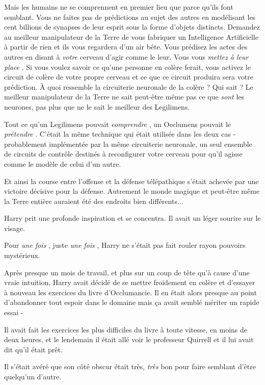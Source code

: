Mais les humains ne se comprennent en premier lieu que parce qu'ils font semblant. Vous ne faites pas de prédictions au sujet des autres en modélisant les cent billions de synapses de leur esprit sous la forme d'objets distincts. Demandez au meilleur manipulateur de la Terre de vous fabriquer un Intelligence Artificielle à partir de rien et ils vous regardera d'un air bête. Vous prédisez les actes des autres en disant à \emph{votre}  cerveau d'agir comme le leur. Vous vous \emph{mettez à leur place} . Si vous voulez savoir ce qu'une personne en colère ferait, vous activez le circuit de colère de votre propre cerveau et ce que ce circuit produira sera votre prédiction. À quoi ressemble la circuiterie neuronale de la colère ? Qui sait ? Le meilleur manipulateur de la Terre ne sait peut-être même pas ce que \emph{sont } les neurones, pas plus que ne le sait le meilleur des Legilimens.

Tout ce qu'un Legilimens pouvait \emph{comprendre} , un Occlumens pouvait le \emph{prétendre} . C'était la même technique qui était utilisée dans les deux cas - probablement implémentée par la même circuiterie neuronale, un seul ensemble de circuits de contrôle destinés à reconfigurer votre cerveau pour qu'il agisse comme le modèle de celui d'un autre.

Et ainsi la course entre l'offense et la défense télépathique s'était achevée par une victoire décisive pour la défense. Autrement le monde magique et peut-être même la Terre entière auraient été des endroits bien différents...

Harry prit une profonde inspiration et se concentra. Il avait un léger sourire sur le visage.

Pour \emph{une fois} , juste \emph{une fois} , Harry ne s'était pas fait rouler rayon pouvoirs mystérieux.

Après presque un mois de travail, et plus sur un coup de tête qu'à cause d'une vraie intuition, Harry avait décidé de se mettre froidement en colère et d'essayer à nouveau les exercices du livre d'Occlumancie. Il en était alors presque au point d'abandonner tout espoir dans le domaine mais ça avait semblé mériter un rapide essai -

Il avait fait les exercices les plus difficiles du livre à toute vitesse, en moins de deux heures, et le lendemain il était allé voir le professeur Quirrell et il lui avait dit qu'il était prêt.

Il s'était avéré que son côté obscur était très, \emph{très}  bon pour faire semblant d'être quelqu'un d'autre.

